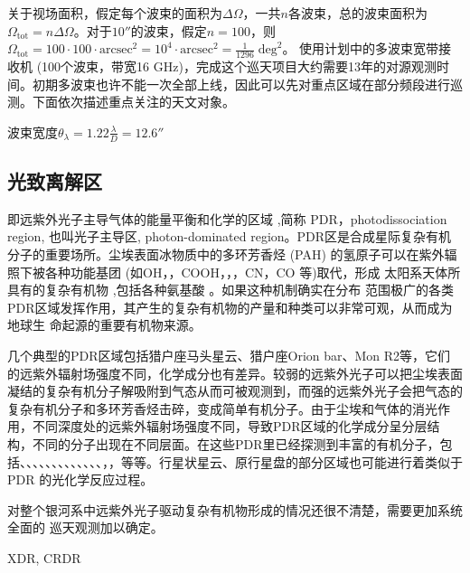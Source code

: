 \documentclass[a4paper]{article}
\newcommand\Hii{H\;\textsc{ii}}
\begin{document}
关于视场面积，假定每个波束的面积为\(\Delta \Omega\)，一共\(n\)各波束，总的波束面积为\(\Omega_\text{tot} = n\Delta\Omega\)。对于\(10''\)的波束，假定\(n=100\)，则\(\Omega_\text{tot} = 100\cdot 100\cdot \mathrm{arcsec}^2 = 10^4\cdot \mathrm{arcsec}^2 = \frac{1}{1296}\;\text{deg}^2\)。
使用计划中的多波束宽带接收机 (100个波束，带宽16 GHz)，完成这个巡天项目大约需要13年的对源观测时间。初期多波束也许不能一次全部上线，因此可以先对重点区域在部分频段进行巡测。下面依次描述重点关注的天文对象。

波束宽度\(\theta_\lambda = 1.22\frac{\lambda}{D} = 12.6''\frac{}{}\)

\subsection{光致离解区} 即远紫外光子主导气体的能量平衡和化学的区域 \citep{Tielens2005} ,简称 PDR，photodissociation region, 也叫光子主导区, photon-dominated region。PDR区是合成星际复杂有机分子的重要场所。尘埃表⾯冰物质中的多环芳香烃 (PAH) 的氢原子可以在紫外辐照下被各种功能基团 (如OH，，COOH，，，CN，CO 等)取代，形成 太阳系天体所具有的复杂有机物 \citep{Bernstein2002},包括各种氨基酸 \citep{Bernstein2002a}。如果这种机制确实在分布 范围极广的各类PDR区域发挥作用，其产生的复杂有机物的产量和种类可以非常可观，从⽽成为地球生 命起源的重要有机物来源。

几个典型的PDR区域包括猎户座马头星云、猎户座Orion bar、Mon R2等，它们的远紫外辐射场强度不同，化学成分也有差异。较弱的远紫外光子可以把尘埃表面凝结的复杂有机分子解吸附到气态从而可被观测到，而强的远紫外光子会把气态的复杂有机分子和多环芳香烃击碎，变成简单有机分子。由于尘埃和气体的消光作用，不同深度处的远紫外辐射场强度不同，导致PDR区域的化学成分呈分层结构，不同的分子出现在不同层面。在这些PDR里已经探测到丰富的有机分子，包括、、、、、、、、、、、、、，，等等。行星状星云、原行星盘的部分区域也可能进行着类似于 PDR 的光化学反应过程。

对整个银河系中远紫外光子驱动复杂有机物形成的情况还很不清楚，需要更加系统全面的 巡天观测加以确定。

XDR, CRDR
\end{document}
